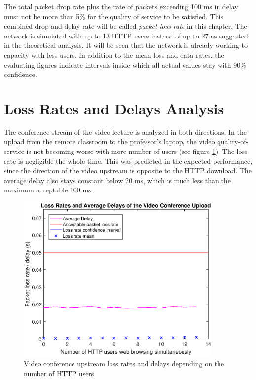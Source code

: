 \documentclass[a4paper,10pt]{book}\usepackage{graphicx}
\begin{document}
The total packet drop rate plus the rate of packets exceeding 100 ms in delay must not be more than 5\% for the quality of service to be satisfied. This combined drop-and-delay-rate will be called \textit{packet loss rate} in this chapter. The network is simulated with up to 13 HTTP users instead of up to 27 as suggested in the theoretical analysis. It will be seen that the network is already working to capacity with less users. In addition to the mean loss and data rates, the evaluating figures indicate intervals inside which all actual values stay with 90\% confidence.

\section{Loss Rates and Delays Analysis}

The conference stream of the video lecture is analyzed in both directions. In the upload from the remote classroom to the professor's laptop, the video quality-of-service is not becoming worse with more number of users (see figure \ref{fig:onLossConfUpload}). The loss rate is  negligible the whole time. This was predicted in the expected performance, since the direction of the video upstream is opposite to the HTTP download. The average delay also stays constant below 20 ms, which is much less than the maximum acceptable 100 ms.

\begin{figure}[!ht]
  \begin{center}
    \includegraphics[width=0.9\textwidth]{on_loss_conf_upload.eps}
    \caption{Video conference upstream loss rates and delays depending on the number of HTTP users}
    \label{fig:onLossConfUpload}
  \end{center}
\end{figure}
\end{document}
